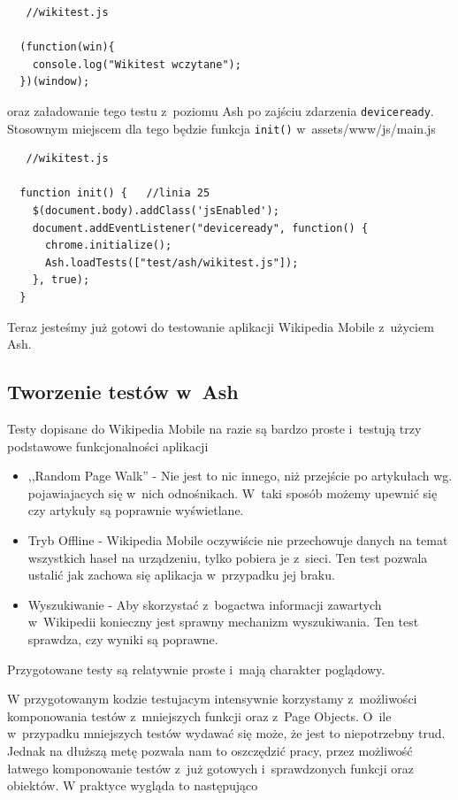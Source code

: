 \documentclass[brudnopis]{xmgr}
\begin{document}
\begin{lstlisting}
   //wikitest.js

  (function(win){  
    console.log("Wikitest wczytane");
  })(window);
\end{lstlisting}

oraz załadowanie tego testu z~poziomu Ash po zajściu zdarzenia \texttt{deviceready}. Stosownym miejscem dla tego będzie funkcja \texttt{init()} w~assets/www/js/main.js

\begin{lstlisting}
   //wikitest.js

  function init() {   //linia 25
    $(document.body).addClass('jsEnabled');
    document.addEventListener("deviceready", function() {
      chrome.initialize(); 
      Ash.loadTests(["test/ash/wikitest.js"]);
    }, true);
  }
\end{lstlisting}

Teraz jesteśmy już gotowi do testowanie aplikacji Wikipedia Mobile z~użyciem Ash.

\subsection{Tworzenie testów w~Ash}

Testy dopisane do Wikipedia Mobile na razie są bardzo proste i~testują trzy podstawowe funkcjonalności aplikacji 

\begin{itemize}
  \item ,,Random Page Walk'' - Nie jest to nic innego, niż przejście po artykułach wg. pojawiajacych się w~nich odnośnikach. W~taki sposób możemy upewnić się czy artykuły są poprawnie wyświetlane.
  \item Tryb Offline - Wikipedia Mobile oczywiście nie przechowuje danych na temat wszystkich haseł na urządzeniu, tylko pobiera je z~sieci. Ten test pozwala ustalić jak zachowa się aplikacja w~przypadku jej braku.
  \item Wyszukiwanie - Aby skorzystać z~bogactwa informacji zawartych w~Wikipedii konieczny jest sprawny mechanizm wyszukiwania. Ten test sprawdza, czy wyniki są poprawne.  
\end{itemize}

Przygotowane testy są relatywnie proste i~mają charakter poglądowy. 

W przygotowanym kodzie testujacym intensywnie korzystamy z~możliwości komponowania testów z~mniejszych funkcji oraz z~Page Objects. O~ile w~przypadku mniejszych testów wydawać się może, że jest to niepotrzebny trud. Jednak na dłuższą metę pozwala nam to oszczędzić pracy, przez możliwość łatwego komponowanie testów z~już gotowych i~sprawdzonych funkcji oraz obiektów. W praktyce wygląda to następująco
\end{document}
